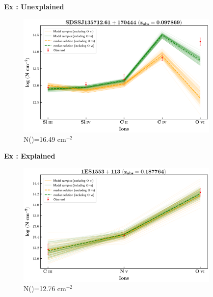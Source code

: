 \documentclass[aspectratio=169,draft]{beamer}
\newcommand\ion[2]{\text{#1\,\textsc{\lowercase{#2}}}}
\begin{document}
\begin{frame}[noframenumbering]{\textbf{Ex : Unexplained}}

\begin{figure}[!htbp]
  \centering
  \includegraphics[width=10cm]{Figures/s135712-z=0.097869-compII.png}
  \vspace*{-1mm}
  \caption{N(\ion{H}{i})=16.49 cm$^{-2}$}
\end{figure}  

\end{frame}


\begin{frame}[noframenumbering]{\textbf{Ex : Explained}}

\begin{figure}[!htbp]
  \centering
  \includegraphics[width=10cm]{Figures/1es1553-z=0.187764-compI.png}
  \vspace*{-1mm}
  \caption{N(\ion{H}{i})=12.76 cm$^{-2}$}
\end{figure}  

\end{frame}
\end{document}
